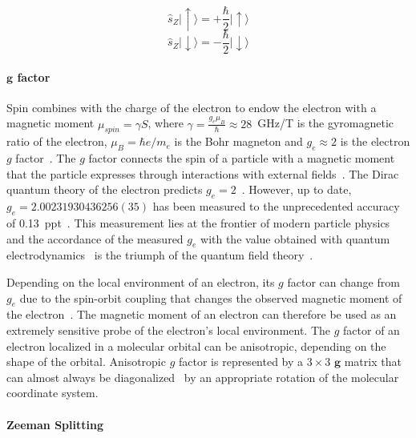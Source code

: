 \begin{equation}
\label{eq:sz_states}
\hat{s}_Z\vert{\uparrow}\rangle = +\frac{\hbar}{2}\vert{\uparrow\rangle}
\end{equation}
\begin{equation*}
\hat{s}_Z\vert{\downarrow\rangle}=-\frac{\hbar}{2}\vert{\downarrow\rangle}
\end{equation*}


\paragraph*{$\textbf{g}$ factor}

Spin combines with the charge of the electron to endow the electron with a magnetic moment $\mu_{spin} = \gamma S$, where $\gamma=\frac{g_e\mu_B}{\hbar}\approx 28$~GHz/T is the gyromagnetic ratio of the electron, $\mu_B=\hbar e/m_e$ is the Bohr magneton and $g_e \approx 2$ is the electron $g$ factor~\cite{Carrington_g_factor}. The $g$ factor connects the spin of a particle with a magnetic moment that the particle expresses through interactions with external fields~\cite{Schwinger1948}. The Dirac quantum theory of the electron predicts $g_e=2$~\cite{dirac1928}. However, up to date, $g_e = 2.00231930436256(35)$ has been measured to the unprecedented accuracy of 0.13~ppt~\cite{Fan2023_PRL}. This measurement lies at the frontier of modern particle physics and the accordance of the measured $g_e$ with the value obtained with quantum electrodynamics~\cite{Schwinger1948,Fan2023_PRL} is the triumph of the quantum field theory~\cite{Feynman_1949}. 
\par
Depending on the local environment of an electron, its $g$ factor can change from $g_e$ due to the spin-orbit coupling that changes the observed magnetic moment of the electron~\cite{Carrington_g_factor}. The magnetic moment of an electron can therefore be used as an extremely sensitive probe of the electron's local environment. The $g$ factor of an electron localized in a molecular orbital can be anisotropic, depending on the shape of the orbital. Anisotropic $g$ factor is represented by a $3\times3$ $\textbf{g}$ matrix that can almost always be diagonalized~\cite{Carrington_g_factor} by an appropriate rotation of the molecular coordinate system.



\paragraph*{Zeeman Splitting}

